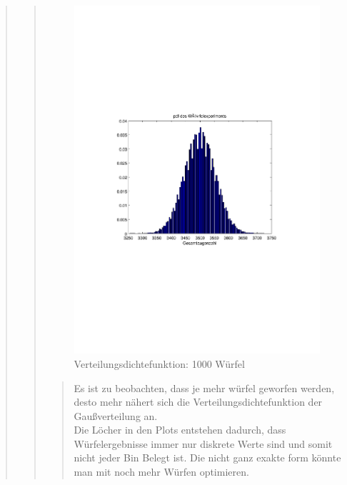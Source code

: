 \begin{quote}
\begin{quote}
        \begin{figure}[H]
        \centering
            \includegraphics[scale=0.7, trim = 20mm 80mm 20mm 90mm, clip]{Bilder/A1_3_1000}
                \caption{Verteilungsdichtefunktion: 1000 Würfel}
                \label{fig:A1_3_1000}
        \end{figure}
    


        \begin{quote}
            

            
            Es ist zu beobachten, dass je mehr würfel geworfen werden, desto mehr nähert sich die Verteilungsdichtefunktion der
            Gaußverteilung an.\\
            Die Löcher in den Plots entstehen dadurch, dass Würfelergebnisse immer nur diskrete Werte sind und somit nicht jeder
            Bin Belegt ist. Die nicht ganz exakte form könnte man mit noch mehr Würfen optimieren.
            

\end{quote}
\end{quote}
\end{quote}
